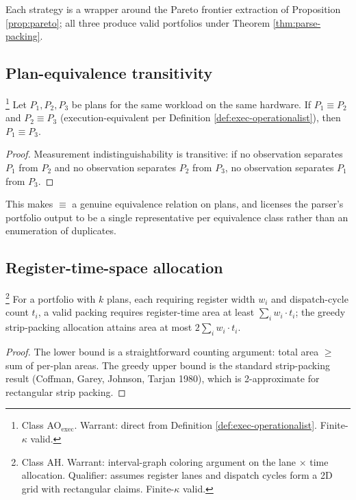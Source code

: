 Each strategy is a wrapper around the Pareto
frontier extraction of Proposition \ref{prop:pareto};
all three produce valid portfolios under
Theorem \ref{thm:parse-packing}.

\subsection{Plan-equivalence transitivity}

\begin{proposition}
  \label{prop:plan-trans}
  \footnote{Class \textsf{AO}$_{\mathrm{exec}}$.
  Warrant: direct from
  Definition \ref{def:exec-operationalist}.
  Finite-$\kappa$ valid.}
  Let $P_1, P_2, P_3$ be plans for the same
  workload on the same hardware. If $P_1 \equiv
  P_2$ and $P_2 \equiv P_3$ (execution-equivalent
  per Definition \ref{def:exec-operationalist}),
  then $P_1 \equiv P_3$.
\end{proposition}

\begin{proof}
  Measurement indistinguishability is transitive:
  if no observation separates $P_1$ from $P_2$ and
  no observation separates $P_2$ from $P_3$, no
  observation separates $P_1$ from $P_3$.
\end{proof}

This makes $\equiv$ a genuine equivalence relation
on plans, and licenses the parser's portfolio
output to be a single representative per equivalence
class rather than an enumeration of duplicates.

\subsection{Register-time-space allocation}

\begin{theorem}
  \label{thm:reg-bound}
  \footnote{Class \textsf{AH}. Warrant: interval-graph
  coloring argument on the lane $\times$ time
  allocation. Qualifier: assumes register lanes and
  dispatch cycles form a 2D grid with rectangular
  claims. Finite-$\kappa$ valid.}
  For a portfolio with $k$ plans, each requiring
  register width $w_i$ and dispatch-cycle count
  $t_i$, a valid packing requires register-time
  area at least $\sum_i w_i \cdot t_i$; the greedy
  strip-packing allocation attains area at most
  $2 \sum_i w_i \cdot t_i$.
\end{theorem}

\begin{proof}
  The lower bound is a straightforward counting
  argument: total area $\geq$ sum of per-plan
  areas. The greedy upper bound is the standard
  strip-packing result (Coffman, Garey, Johnson,
  Tarjan 1980), which is 2-approximate for
  rectangular strip packing.
\end{proof}

